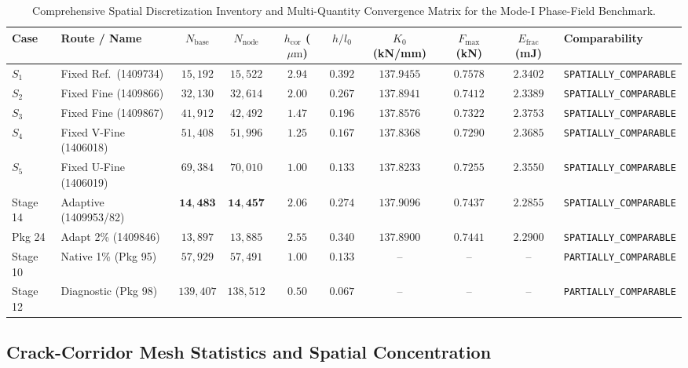 \begin{table}[htbp]
\centering
\footnotesize
\setlength{\tabcolsep}{3pt}
\caption{Comprehensive Spatial Discretization Inventory and Multi-Quantity Convergence Matrix for the Mode-I Phase-Field Benchmark.}
\label{tab:stage14ut_spatial_inventory}
\begin{tabularx}{\textwidth}{l p{2.2cm} c c c c c c c X}
\toprule
\textbf{Case} & \textbf{Route / Name} & $N_{\mathrm{base}}$ & $N_{\mathrm{node}}$ & $h_{\mathrm{cor}}$ ($\mu\mathrm{m}$) & $h/l_0$ & $K_0$ (kN/mm) & $F_{\max}$ (kN) & $E_{\mathrm{frac}}$ (mJ) & \textbf{Comparability} \\
\midrule
$S_1$ & Fixed Ref.\ (1409734) & $15,192$ & $15,522$ & $2.94$ & $0.392$ & $137.9455$ & $0.7578$ & $2.3402$ & \texttt{SPATIALLY\_COMPARABLE} \\
$S_2$ & Fixed Fine (1409866) & $32,130$ & $32,614$ & $2.00$ & $0.267$ & $137.8941$ & $0.7412$ & $2.3389$ & \texttt{SPATIALLY\_COMPARABLE} \\
$S_3$ & Fixed Fine (1409867) & $41,912$ & $42,492$ & $1.47$ & $0.196$ & $137.8576$ & $0.7322$ & $2.3753$ & \texttt{SPATIALLY\_COMPARABLE} \\
$S_4$ & Fixed V-Fine (1406018) & $51,408$ & $51,996$ & $1.25$ & $0.167$ & $137.8368$ & $0.7290$ & $2.3685$ & \texttt{SPATIALLY\_COMPARABLE} \\
$S_5$ & Fixed U-Fine (1406019) & $69,384$ & $70,010$ & $1.00$ & $0.133$ & $137.8233$ & $0.7255$ & $2.3550$ & \texttt{SPATIALLY\_COMPARABLE} \\
\midrule
Stage 14 & Adaptive (1409953/82) & $\mathbf{14,483}$ & $\mathbf{14,457}$ & $\mathbf{2.06}$ & $\mathbf{0.274}$ & $\mathbf{137.9096}$ & $\mathbf{0.7437}$ & $\mathbf{2.2855}$ & \texttt{SPATIALLY\_COMPARABLE} \\
Pkg 24 & Adapt 2\% (1409846) & $13,897$ & $13,885$ & $2.55$ & $0.340$ & $137.8900$ & $0.7441$ & $2.2900$ & \texttt{SPATIALLY\_COMPARABLE} \\
\midrule
Stage 10 & Native 1\% (Pkg 95) & $57,929$ & $57,491$ & $1.00$ & $0.133$ & -- & -- & -- & \texttt{PARTIALLY\_COMPARABLE} \\
Stage 12 & Diagnostic (Pkg 98) & $139,407$ & $138,512$ & $0.50$ & $0.067$ & -- & -- & -- & \texttt{PARTIALLY\_COMPARABLE} \\
\bottomrule
\end{tabularx}
\end{table}

\subsection{Crack-Corridor Mesh Statistics and Spatial Concentration}
\label{subsec:stage14ut_corridor_statistics}

